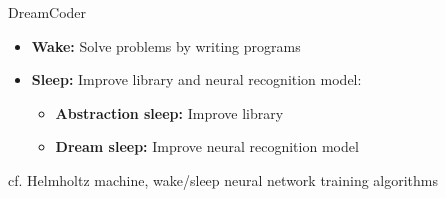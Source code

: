 \documentclass{beamer}
\newcommand{\1}[1]{\mathds{1}\left[#1\right]}
\newcommand\Wider[2][3em]{%
\makebox[\linewidth][c]{%
  \begin{minipage}{\dimexpr\textwidth+#1\relax}
  \raggedright#2
  \end{minipage}%
  }%
}
\begin{document}
\begin{frame}{DreamCoder}
  \begin{itemize}
  \item   \textbf{Wake:} Solve problems by writing programs
  \item \textbf{Sleep:} Improve library and neural recognition model:
    \begin{itemize}
    \item \textbf{Abstraction sleep:} Improve library
      \item \textbf{Dream sleep:} Improve neural recognition model
    \end{itemize}
  \end{itemize}
  \Wider[5.4em]{
    \begin{center}
      \begin{tikzpicture}
  \end{tikzpicture}
        \end{center}}

\hspace*{-0.4cm}\small cf. Helmholtz machine, wake/sleep neural network training algorithms
\end{frame}
\end{document}
